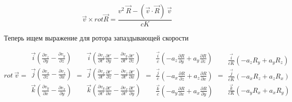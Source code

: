 \documentclass[11pt]{article}
\begin{document}
\[\overrightarrow{v}\times rot\overrightarrow{R}=\frac{{{v}^{2}}\ \overrightarrow{R}-\left( \overrightarrow{v}\cdot \overrightarrow{R} \right)\ \overrightarrow{v}}{cK}\]

Теперь ищем выражение для ротора запаздывающей скорости

\[rot\ \overrightarrow{v}=\begin{matrix}
   \overrightarrow{i}\left( \frac{\partial {{v}_{z}}}{\partial y}-\frac{\partial {{v}_{y}}}{\partial z} \right)  \\
   \overrightarrow{j}\left( \frac{\partial {{v}_{x}}}{\partial z}-\frac{\partial {{v}_{z}}}{\partial x} \right)  \\
   \overrightarrow{k}\left( \frac{\partial {{v}_{y}}}{\partial x}-\frac{\partial {{v}_{x}}}{\partial y} \right)  \\
\end{matrix}=\begin{matrix}
   \overrightarrow{i}\left( \frac{\partial {{v}_{z}}}{\partial t'}\frac{\partial t'}{\partial y}-\frac{\partial {{v}_{y}}}{\partial t'}\frac{\partial t'}{\partial z} \right)  \\
   \overrightarrow{j}\left( \frac{\partial {{v}_{x}}}{\partial t'}\frac{\partial t'}{\partial z}-\frac{\partial {{v}_{z}}}{\partial t'}\frac{\partial t'}{\partial x} \right)  \\
   \overrightarrow{k}\left( \frac{\partial {{v}_{y}}}{\partial t'}\frac{\partial t'}{\partial x}-\frac{\partial {{v}_{x}}}{\partial t'}\frac{\partial t'}{\partial y} \right)  \\
\end{matrix}=\begin{matrix}
   \frac{\overrightarrow{i}}{c}\left( -{{a}_{z}}\frac{\partial R}{\partial y}+{{a}_{y}}\frac{\partial R}{\partial z} \right)  \\
   \frac{\overrightarrow{j}}{c}\left( -{{a}_{x}}\frac{\partial R}{\partial z}+{{a}_{z}}\frac{\partial R}{\partial x} \right)  \\
   \frac{\overrightarrow{k}}{c}\left( -{{a}_{y}}\frac{\partial R}{\partial x}+{{a}_{x}}\frac{\partial R}{\partial y} \right)  \\
\end{matrix}=\begin{matrix}
   \frac{\overrightarrow{i}}{cK}\left( -{{a}_{z}}{{R}_{y}}+{{a}_{y}}{{R}_{z}} \right)  \\
   \frac{\overrightarrow{j}}{cK}\left( -{{a}_{x}}{{R}_{z}}+{{a}_{z}}{{R}_{x}} \right)  \\
   \frac{\overrightarrow{k}}{cK}\left( -{{a}_{y}}{{R}_{x}}+{{a}_{x}}{{R}_{y}} \right)  \\
\end{matrix}\]
\end{document}
